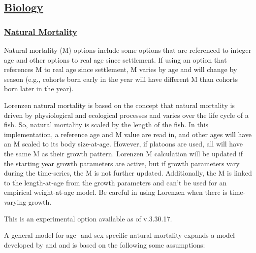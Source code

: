 \hypertarget{Biology}{}
\subsection[Biology]{\protect\hyperlink{Biology}{Biology}}
\hypertarget{NatM}{}
\subsubsection[Natural Mortality]{\protect\hyperlink{NatM}{Natural Mortality}}
Natural mortality (M) options include some options that are referenced to integer age and other options to real age since settlement. If using an option that references M to real age since settlement, M varies by age and will change by season (e.g., cohorts born early in the year will have different M than cohorts born later in the year).

Lorenzen natural mortality is based on the concept that natural mortality is driven by physiological and ecological processes and varies over the life cycle of a fish. So, natural mortality is scaled by the length of the fish. In this implementation, a reference age and M value are read in, and other ages will have an M scaled to its body size-at-age. However, if platoons are used, all will have the same M as their growth pattern. Lorenzen M calculation will be updated if the starting year growth parameters are active, but if growth parameters vary during the time-series, the M is not further updated. Additionally, the M is linked to the length-at-age from the growth parameters and can't be used for an empirical weight-at-age model. Be careful in using Lorenzen when there is time-varying growth.


This is an experimental option available as of v.3.30.17. 

A general model for age- and sex-specific natural mortality expands a model developed by \citet{maunder2010bigeye} and \citet{maunder2011M} and is based on the following some assumptions:

